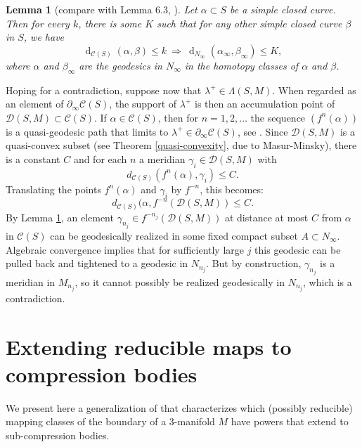 \documentclass[12pt]{amsart}
\newtheorem{lemma}[theorem]{Lemma}
\theoremstyle{definition}
\theoremstyle{remark}
\DeclareMathOperator{\dist}{d}
\begin{document}
\begin{lemma}[compare with Lemma 6.3, \cite{Biringerextending}]
	\label{distanceboundslem}
Let $\alpha \subset S  $ be a simple closed curve.  Then for every $k $, there is some $K $ such that for any other simple closed curve $\beta $ in $ S  $, we have $$\dist_{\mathcal C (S )}(\alpha, \beta) \leq k \ \Longrightarrow \ \dist_{ N_\infty }(\alpha_\infty, \beta_\infty) \leq K,$$
	where $\alpha$ and $\beta_\infty $ are the geodesics in $N_\infty $ in the homotopy classes of $\alpha$ and $\beta$.
\end{lemma}

Hoping for a contradiction, suppose now that $\lambda^+ \in \Lambda (S , M) $.  When regarded as an element of $\partial_\infty \mathcal C (S ) $, the support of $\lambda^+ $ is then an accumulation point of $\mathcal D(S ,M) \subset \mathcal C (S ) $.  If $\alpha \in  \mathcal C (S ) $, then for $n=1,2,\ldots $ the sequence $(f ^ n(\alpha))$ is a quasi-geodesic path that limits to $\lambda^+  \in\partial_\infty \mathcal C (S ) $, see \cite{Masurgeometry1}.   Since $\mathcal D(S ,M)$ is a quasi-convex subset (see Theorem \ref {quasi-convexity}, due to Masur-Minsky), there is a constant $C $ and for each $n $ a meridian $\gamma_i \in \mathcal D(S ,M) $ with
$$d_{\mathcal C (S ) }(f ^ n(\alpha),\gamma_i) \leq C.$$
Translating the points $f^n( \alpha)$ and $\gamma_i$ by $f^{-n}$, this becomes:
$$d_{\mathcal C (S ) }(\alpha,f^{-n}(\mathcal D(S ,M)) \leq C.$$
By Lemma \ref {distanceboundslem}, an element $\gamma_{n_j} \in f^{-n_j}(\mathcal D(S ,M))$ at distance at most $C$ from $\alpha $ in $\mathcal C (S ) $ can be geodesically realized in some fixed compact subset $A \subset N_\infty$.  Algebraic convergence implies that for sufficiently large $j $ this geodesic can be pulled back and tightened to a geodesic in $N_{n_j}$.  But by construction, $\gamma_{n_j}$ is a meridian in $M_{n_j}$, so it cannot possibly be realized geodesically in $N_{n_j}$, which is a contradiction.



\section{Extending reducible maps to compression bodies}

\label {sec:extension}
We present here a generalization of \cite [Theorem 1.1] {Biringerextending} that characterizes which (possibly reducible) mapping classes of the boundary of a $3$-manifold $M$ have powers that extend to sub-compression bodies.  
\end{document}

